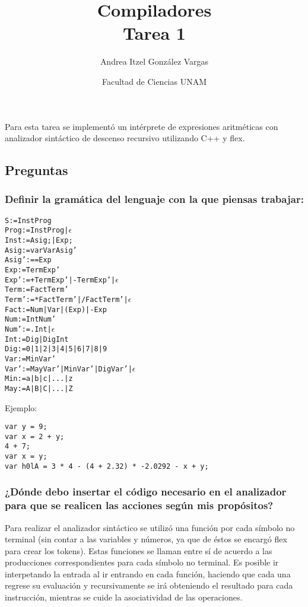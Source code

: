 \documentclass[12pt]{article}
\title{Compiladores \\ Tarea 1}
\author{Andrea Itzel González Vargas}
\date{Facultad de Ciencias UNAM}
\begin{document}
\maketitle

Para esta tarea se implementó un intérprete de expresiones aritméticas con analizador sintáctico de descenso recursivo utilizando \textsf{C++} y \textsf{flex}.

\subsection{Preguntas}

\subsubsection{Definir la gramática del lenguaje con la que piensas trabajar:}
\begin{alltt}
S     := InstProg
Prog  := InstProg | \(\epsilon\)
Inst  := Asig; | Exp;
Asig  := var VarAsig'
Asig' := =Exp
Exp   := TermExp'
Exp'  := +TermExp' | -TermExp' | \(\epsilon\)
Term  := FactTerm'
Term' := *FactTerm' | /FactTerm' | \(\epsilon\)
Fact  := Num | Var | (Exp) | -Exp
Num   := IntNum'
Num'  := .Int | \(\epsilon\)
Int   := Dig | DigInt
Dig   := 0 | 1 | 2 | 3 | 4 | 5 | 6 | 7 | 8 | 9
Var   := MinVar'
Var'  := MayVar' | MinVar' | DigVar' | \(\epsilon\)
Min   := a | b | c | ... | z
May   := A | B | C | ... | Z
\end{alltt}

Ejemplo:
\begin{verbatim}
var y = 9;
var x = 2 + y;
4 + 7;
var x = y;
var h0lA = 3 * 4 - (4 + 2.32) * -2.0292 - x + y;
\end{verbatim}

\subsubsection*{¿Dónde debo insertar el código necesario en el analizador para que se realicen las acciones según mis propósitos?}

Para realizar el analizador sintáctico se utilizó una función por cada símbolo no terminal (sin contar a las variables y números, ya que de éstos se encargó \textsf{flex} para crear los tokens). Estas funciones se llaman entre sí de acuerdo a las producciones correspondientes para cada símbolo no terminal. Es posible ir interpetando la entrada al ir entrando en cada función, haciendo que cada una regrese su evaluación y recursivamente se irá obteniendo el resultado para cada instrucción, mientras se cuide la asociatividad de las operaciones. \\
\end{document}
